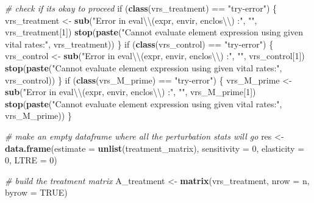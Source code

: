 \documentclass[]{article}
\newenvironment{Shaded}{\begin{snugshade}}{\end{snugshade}}
\newcommand{\KeywordTok}[1]{\textcolor[rgb]{0.13,0.29,0.53}{\textbf{{#1}}}}
\newcommand{\DataTypeTok}[1]{\textcolor[rgb]{0.13,0.29,0.53}{{#1}}}
\newcommand{\DecValTok}[1]{\textcolor[rgb]{0.00,0.00,0.81}{{#1}}}
\newcommand{\CharTok}[1]{\textcolor[rgb]{0.31,0.60,0.02}{{#1}}}
\newcommand{\StringTok}[1]{\textcolor[rgb]{0.31,0.60,0.02}{{#1}}}
\newcommand{\CommentTok}[1]{\textcolor[rgb]{0.56,0.35,0.01}{\textit{{#1}}}}
\newcommand{\OtherTok}[1]{\textcolor[rgb]{0.56,0.35,0.01}{{#1}}}
\newcommand{\NormalTok}[1]{{#1}}
\begin{document}
\begin{Shaded}
\begin{Highlighting}[]
{      
      \CommentTok{# check if its okay to proceed}
      \NormalTok{if (}\KeywordTok{class}\NormalTok{(vrs_treatment) ==}\StringTok{ "try-error"}\NormalTok{) \{}
        \NormalTok{vrs_treatment <-}\StringTok{ }\KeywordTok{sub}\NormalTok{(}\StringTok{"Error in eval}\CharTok{\textbackslash{}\textbackslash{}}\StringTok{(expr, envir, enclos}\CharTok{\textbackslash{}\textbackslash{}}\StringTok{) :"}\NormalTok{,}
                   \StringTok{""}\NormalTok{, vrs_treatment[}\DecValTok{1}\NormalTok{])}
        \KeywordTok{stop}\NormalTok{(}\KeywordTok{paste}\NormalTok{(}\StringTok{"Cannot evaluate element expression using given vital rates:"}\NormalTok{,}
                   \NormalTok{vrs_treatment))}
      \NormalTok{\}}
      \NormalTok{if (}\KeywordTok{class}\NormalTok{(vrs_control) ==}\StringTok{ "try-error"}\NormalTok{) \{}
        \NormalTok{vrs_control <-}\StringTok{ }\KeywordTok{sub}\NormalTok{(}\StringTok{"Error in eval}\CharTok{\textbackslash{}\textbackslash{}}\StringTok{(expr, envir, enclos}\CharTok{\textbackslash{}\textbackslash{}}\StringTok{) :"}\NormalTok{,}
                        \StringTok{""}\NormalTok{, vrs_control[}\DecValTok{1}\NormalTok{])}
        \KeywordTok{stop}\NormalTok{(}\KeywordTok{paste}\NormalTok{(}\StringTok{"Cannot evaluate element expression using given vital rates:"}\NormalTok{,}
                   \NormalTok{vrs_control))}
      \NormalTok{\}}
      \NormalTok{if (}\KeywordTok{class}\NormalTok{(vrs_M_prime) ==}\StringTok{ "try-error"}\NormalTok{) \{}
        \NormalTok{vrs_M_prime <-}\StringTok{ }\KeywordTok{sub}\NormalTok{(}\StringTok{"Error in eval}\CharTok{\textbackslash{}\textbackslash{}}\StringTok{(expr, envir, enclos}\CharTok{\textbackslash{}\textbackslash{}}\StringTok{) :"}\NormalTok{,}
                        \StringTok{""}\NormalTok{, vrs_M_prime[}\DecValTok{1}\NormalTok{])}
        \KeywordTok{stop}\NormalTok{(}\KeywordTok{paste}\NormalTok{(}\StringTok{"Cannot evaluate element expression using given vital rates:"}\NormalTok{,}
                   \NormalTok{vrs_M_prime))}
      \NormalTok{\}}
      
      \CommentTok{# make an empty dataframe where all the perturbation stats will go}
      \NormalTok{res <-}\StringTok{ }\KeywordTok{data.frame}\NormalTok{(}\DataTypeTok{estimate =} \KeywordTok{unlist}\NormalTok{(treatment_matrix), }\DataTypeTok{sensitivity =} \DecValTok{0}\NormalTok{, }
                        \DataTypeTok{elasticity =} \DecValTok{0}\NormalTok{, }\DataTypeTok{LTRE =} \DecValTok{0}\NormalTok{)}
      
      \CommentTok{# build the treatment matrix}
      \NormalTok{A_treatment <-}\StringTok{ }\KeywordTok{matrix}\NormalTok{(vrs_treatment, }\DataTypeTok{nrow =} \NormalTok{n, }\DataTypeTok{byrow =} \OtherTok{TRUE}\NormalTok{)}
      
}
\end{Highlighting}
\end{Shaded}
\end{document}
